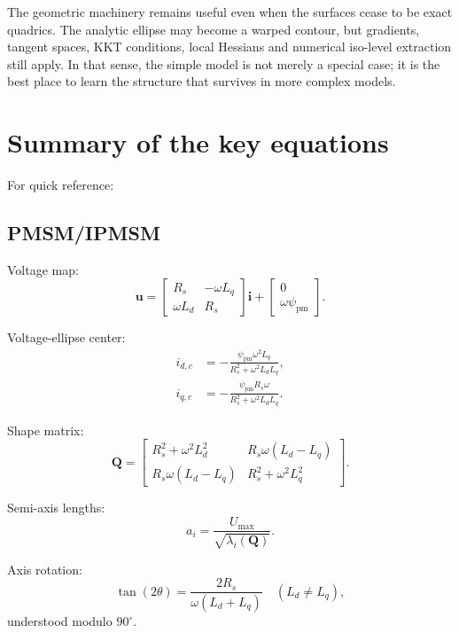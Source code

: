 \documentclass[11pt,a4paper]{article}
\newcommand{\Rs}{R_s}
\newcommand{\Ld}{L_d}
\newcommand{\Lq}{L_q}
\newcommand{\psipm}{\psi_{\mathrm{pm}}}
\newcommand{\w}{\omega}
\newcommand{\Umax}{U_{\max}}
\newcommand{\vct}[1]{\bm{#1}}
\newcommand{\mat}[1]{\bm{#1}}
\begin{document}
The geometric machinery remains useful even when the surfaces cease to be exact quadrics. The analytic ellipse may become a warped contour, but gradients, tangent spaces, KKT conditions, local Hessians and numerical iso-level extraction still apply. In that sense, the simple model is not merely a special case; it is the best place to learn the structure that survives in more complex models.

\section{Summary of the key equations}

For quick reference:

\subsection*{PMSM/IPMSM}

Voltage map:
\begin{equation}
\vct u=
\begin{bmatrix}
\Rs&-\w\Lq\\
\w\Ld&\Rs
\end{bmatrix}
\vct i+
\begin{bmatrix}0\\\w\psipm\end{bmatrix}.
\end{equation}

Voltage-ellipse center:
\begin{align}
  i_{d,c}&=-\frac{\psipm\w^2\Lq}{\Rs^2+\w^2\Ld\Lq},\\
  i_{q,c}&=-\frac{\psipm\Rs\w}{\Rs^2+\w^2\Ld\Lq}.
\end{align}

Shape matrix:
\begin{equation}
\mat Q=
\begin{bmatrix}
\Rs^2+\w^2\Ld^2 & \Rs\w(\Ld-\Lq)\\
\Rs\w(\Ld-\Lq) & \Rs^2+\w^2\Lq^2
\end{bmatrix}.
\end{equation}

Semi-axis lengths:
\begin{equation}
  a_i=\frac{\Umax}{\sqrt{\lambda_i(\mat Q)}}.
\end{equation}

Axis rotation:
\begin{equation}
  \tan(2\theta)=\frac{2\Rs}{\w(\Ld+\Lq)}
  \quad(\Ld\neq\Lq),
\end{equation}
understood modulo $90^\circ$.
\end{document}

